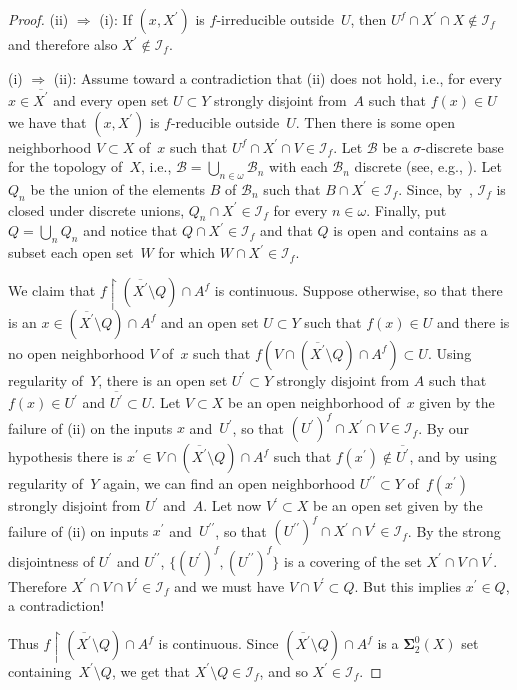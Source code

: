 \documentclass{raex}
\theoremstyle{plain}
\theoremstyle{definition}
\theoremstyle{remark}
\def\B{\mathcal{B}}
\def\S{\mathbf{\Sigma}}
\def\I{\mathcal{I}}
\begin{document}
\begin{proof}
(ii) $\Rightarrow$ (i): If $(x,X^\prime)$ is $f$-irreducible outside~$U$, then $U^f\cap X^\prime\cap X\not\in\I_f$ and therefore also $X^\prime\not\in\I_f$.

(i) $\Rightarrow$ (ii): Assume toward a contradiction that (ii) does not hold, i.e., for every $x\in\overline{X^\prime}$ and every open set $U\subset Y$ strongly disjoint from~$A$ such that $f(x)\in U$ we have that $(x,X^\prime)$ is $f$-reducible outside~$U$. Then there is some open neighborhood $V\subset X$ of~$x$ such that $U^f\cap X^\prime\cap V\in\I_f$. Let $\B$ be a $\sigma$-discrete base for the topology of~$X$, i.e., $\B=\bigcup_{n\in\omega}\B_n$ with each $\B_n$ discrete (see, e.g., \cite[Theorem~4.4.3]{eng}). Let $Q_n$ be the union of the elements $B$ of $\B_n$ such that $B\cap X^\prime\in\I_f$. Since, by~\cite[Lemma~2.2]{mot-sem}, $\I_f$ is closed under discrete unions, $Q_n\cap X^\prime\in\I_f$ for every $n\in\omega$. Finally, put $Q=\bigcup_n Q_n$ and notice that $Q\cap X^\prime\in\I_f$ and that $Q$ is open and contains as a subset each open set~$W$ for which $W\cap X^\prime\in\I_f$.

We claim that $f\restriction(\overline{X^\prime}\setminus Q)\cap A^f$ is continuous. Suppose otherwise, so that there is an $x\in(\overline{X^\prime}\setminus Q)\cap A^f$ and an open set $U\subset Y$ such that $f(x)\in U$ and there is no open neighborhood $V$ of~$x$ such that $f(V\cap(\overline{X^\prime}\setminus Q)\cap A^f)\subset U$. Using regularity of~$Y$, there is an open set $U^\prime\subset Y$ strongly disjoint from $A$ such that $f(x)\in U^\prime$ and $\overline{U^\prime}\subset U$. Let $V\subset X$ be an open neighborhood of~$x$ given by the failure of (ii) on the inputs $x$ and~$U^\prime$, so that $(U^\prime)^f\cap X^\prime\cap V\in\I_f$. By our hypothesis there is $x^\prime\in V\cap(\overline{X^\prime}\setminus Q)\cap A^f$ such that $f(x^\prime)\not\in \overline{U^\prime}$, and by using regularity of~$Y$ again, we can find an open neighborhood $U^{\prime\prime}\subset Y$ of~$f(x^\prime)$ strongly disjoint from $U^\prime$ and~$A$. Let now $V^\prime\subset X$ be an open set given by the failure of (ii) on inputs $x^\prime$ and~$U^{\prime\prime}$, so that $(U^{\prime\prime})^f\cap X^\prime\cap V^\prime\in\I_f$. By the strong disjointness of $U^\prime$ and $U^{\prime\prime}$, $\{(U^\prime)^f,(U^{\prime\prime})^f\}$ is a covering of the set $X^\prime\cap V\cap V^\prime$. Therefore $X^\prime\cap V\cap V^\prime\in\I_f$ and we must have $V\cap V^\prime\subset Q$. But this implies $x^\prime\in Q$, a contradiction!

Thus $f\restriction(\overline{X^\prime}\setminus Q)\cap A^f$ is continuous. Since $(\overline{X^\prime}\setminus Q)\cap A^f$ is a $\S^0_2(X)$ set containing~$X^\prime\setminus Q$, we get that $X^\prime\setminus Q\in\I_f$, and so $X^\prime\in\I_f$.
\end{proof}
\end{document}
